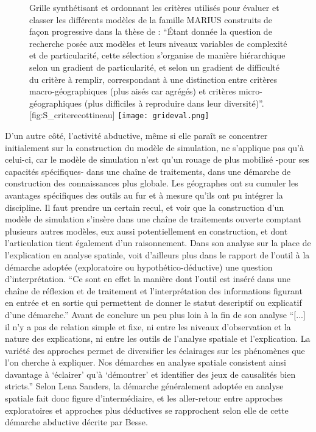 \begin{figure}[htbp]
\begin{sidecaption}{Grille synthétisant et ordonnant les critères utilisés pour évaluer et classer les différents modèles de la famille MARIUS construits de façon progressive dans la thèse de \textcite[329]{Cottineau2014b} : \enquote{Étant donnée la question de recherche posée aux modèles et leurs niveaux variables de complexité et de particularité, cette sélection s’organise de manière hiérarchique selon un gradient de particularité, et selon un gradient de difficulté du critère à remplir, correspondant à une distinction entre critères macro-géographiques (plus aisés car agrégés) et critères micro-géographiques (plus difficiles à reproduire dans leur diversité)}.}[fig:S_criterecottineau]
  \centering
 \texttt{[image: grideval.png]}
  \end{sidecaption}
\end{figure}

D'un autre côté, l'activité abductive, même si elle paraît se concentrer initialement sur la construction du modèle de simulation, ne s'applique pas qu'à celui-ci, car le modèle de simulation n'est qu'un rouage de plus mobilisé -pour ses capacités spécifiques- dans une chaîne de traitements, dans une démarche de construction des connaissances plus globale. Les géographes ont su cumuler les avantages spécifiques des outils au fur et à mesure qu'ils ont pu intégrer la discipline. Il faut prendre un certain recul, et voir que la construction d'un modèle de simulation s'insère dans une chaîne de traitements ouverte comptant plusieurs autres modèles, eux aussi potentiellement en construction, et dont l'articulation tient également d'un raisonnement. Dans son analyse sur la place de l'explication en analyse spatiale, \textcite{Sanders2000} voit d'ailleurs plus dans le rapport de l'outil à la démarche adoptée (exploratoire ou hypothético-déductive) une question d'interprétation. \enquote{Ce sont en effet la manière dont l'outil est inséré dans une chaîne de réflexion et de traitement et l'interprétation des informations figurant en entrée et en sortie qui permettent de donner le statut descriptif ou explicatif d'une démarche.} Avant de conclure un peu plus loin à la fin de son analyse \enquote{[...] il n'y a pas de relation simple et fixe, ni entre les niveaux d'observation et la nature des explications, ni entre les outils de l'analyse spatiale et l'explication. La variété des approches permet de diversifier les éclairages sur les phénomènes que l'on cherche à expliquer. Nos démarches en analyse spatiale consistent ainsi davantage à \enquote{éclairer} qu'à \enquote{démontrer} et identifier des jeux de causalités bien stricts.} Selon Lena Sanders, la démarche généralement adoptée en analyse spatiale fait donc figure d'intermédiaire, et les aller-retour entre approches exploratoires et approches plus déductives se rapprochent selon elle de cette démarche abductive décrite par Besse.

